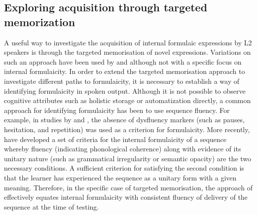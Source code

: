 \documentclass[output=paper]{langscibook}
\begin{document}
\subsection{Exploring acquisition through targeted memorization}\label{sec:cutler:1.3}

A useful way to investigate the acquisition of internal formulaic expressions by L2 speakers is through the targeted memorisation of novel expressions. Variations on such an approach have been used by \citet{Wray2004} and \citet{FitzpatrickWray2006} although not with a specific focus on internal formulaicity. In order to extend the targeted memorisation approach to investigate different paths to formulaicity, it is necessary to establish a way of identifying formulaicity in spoken output. Although it is not possible to observe cognitive attributes such as holistic storage or automatization directly, a common approach for identifying formulaicity has been to use sequence fluency. For example, in studies by \citet{Erman2007} and \citet{Dahlmann2009}, the absence of dysfluency markers (such as pauses, hesitation, and repetition) was used as a criterion for formulaicity. More recently, \citet{MylesCordier2017} have developed a set of criteria for the internal formulaicity of a sequence whereby fluency (indicating phonological coherence) along with evidence of its unitary nature (such as grammatical irregularity or semantic opacity) are the two necessary conditions. A sufficient criterion for satisfying the second condition is that the learner has experienced the sequence as a unitary form with a given meaning. Therefore, in the specific case of targeted memorisation, the approach of \citet{MylesCordier2017} effectively equates internal formulaicity with consistent fluency of delivery of the sequence at the time of testing.
\end{document}
